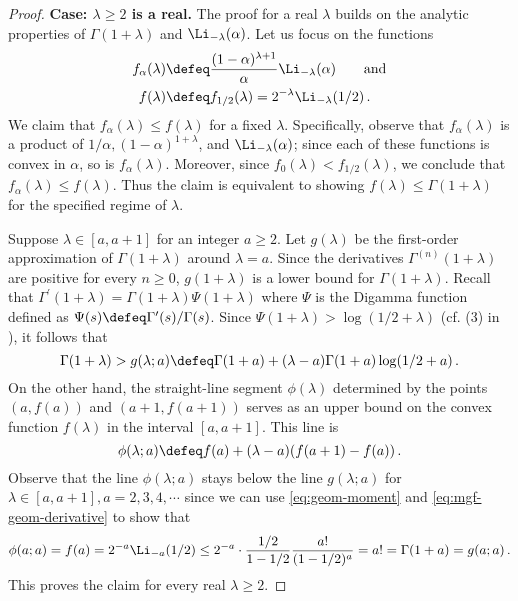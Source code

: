 \begin{proof}
    \noindent
    \textbf{Case: $\lambda \geq 2$ is a real.} The proof for a real $\lambda$ builds on the analytic properties of $\Gamma(1+\lambda)$ and $\Li_{-\lambda}(\alpha)$. 
    Let us focus on the functions
    \begin{align}
        f_\alpha(\lambda) &\defeq \frac{(1-\alpha)^{\lambda+1} }{\alpha} \Li_{-\lambda}(\alpha)
        \qquad\text{and} \\
        f(\lambda) &\defeq f_{1/2}(\lambda) = 2^{-\lambda} \Li_{-\lambda}(1/2)
        \label{eq:f-lambda}
        \, .
    \end{align}
    We claim that $f_\alpha(\lambda) \leq f(\lambda)$ for a fixed $\lambda$. 
    Specifically, observe that $f_\alpha(\lambda)$ is a product of 
    $1/\alpha, (1-\alpha)^{1+\lambda}$, and $\Li_{-\lambda}(\alpha)$; since 
    each of these functions is convex in $\alpha$, so is $f_\alpha(\lambda)$. 
    Moreover, since $f_0(\lambda) < f_{1/2}(\lambda)$, we conclude that $f_{\alpha}(\lambda) \leq f(\lambda)$. 
    Thus the claim is equivalent to showing $f(\lambda) \leq \Gamma(1+\lambda)$ for the specified regime of $\lambda$.

    Suppose $\lambda \in [a, a+1]$ for an integer $a \geq 2$. 
    Let $g(\lambda)$ be the first-order approximation of $\Gamma(1+\lambda)$ around $\lambda = a$. 
    Since the derivatives $\Gamma^{(n)}(1+\lambda)$ are positive for every $n \geq 0$, $g(1+\lambda)$ is a lower bound for $\Gamma(1+\lambda)$. 
    Recall that $\Gamma^\prime(1+\lambda) = \Gamma(1+\lambda) \Psi(1+\lambda)$ where $\Psi$ is the Digamma function defined as $\Psi(s) \defeq \Gamma^\prime(s)/\Gamma(s)$. 
    Since $\Psi(1+\lambda) > \log(1/2+\lambda)$ (cf. (3) in \cite{diamond2016bounds}), it follows that 
    \[
        \Gamma(1+\lambda) 
        > g(\lambda; a) 
        \defeq \Gamma(1+a) + (\lambda - a) \Gamma(1+a) \log(1/2 + a)
        \, .
    \]
    On the other hand, the straight-line segment $\phi(\lambda)$ determined by the points $(a, f(a))$ and $(a+1, f(a+1))$ 
    serves as an upper bound on the convex function $f(\lambda)$ in the interval $[a, a+1]$. 
    This line is 
    \[
        \phi(\lambda; a) \defeq f(a) + (\lambda - a) ( f(a+1) - f(a) )
        \, .
    \] 
    Observe that the line $\phi(\lambda; a)$ stays below the line $g(\lambda; a)$ 
    for $\lambda \in [a, a+1], a = 2, 3, 4, \cdots$ since we can use
    \eqref{eq:geom-moment} and \eqref{eq:mgf-geom-derivative} to show that
    \[
        \phi(a;a) = f(a) 
        = 2^{-a} \Li_{-a}(1/2)  
        \leq 2^{-a} \cdot \frac{1/2}{1-1/2} \frac{a!}{(1-1/2)^a} 
        = a!
        = \Gamma(1+a) = g(a; a)
        \, .
    \]
    This proves the claim for every real $\lambda \geq 2$.


\end{proof}
